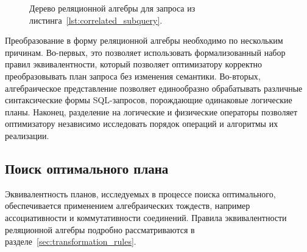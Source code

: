 \documentclass[14pt, russian]{scrartcl}
\begin{document}
\begin{figure}[!htb]\centering
{}
\caption{Дерево реляционной алгебры для запроса из
листинга~\ref{lst:correlated_subquery}.}%
\label{fig:correlated_subquery_tree}
\end{figure}

Преобразование в форму реляционной алгебры необходимо по нескольким причинам.
Во-первых, это позволяет использовать формализованный набор правил
эквивалентности, который позволяет оптимизатору корректно преобразовывать план
запроса без изменения семантики. Во-вторых, алгебраическое представление
позволяет единообразно обрабатывать различные синтаксические формы SQL-запросов,
порождающие одинаковые логические планы. Наконец, разделение на логические и
физические операторы позволяет оптимизатору независимо исследовать порядок
операций и алгоритмы их реализации.

\subsection{Поиск оптимального плана}

Эквивалентность планов, исследуемых в процессе поиска оптимального,
обеспечивается применением алгебраических тождеств, например ассоциативности и
коммутативности соединений. Правила эквивалентности реляционной алгебры подробно
рассматриваются в разделе~\ref{sec:transformation_rules}.
\end{document}
